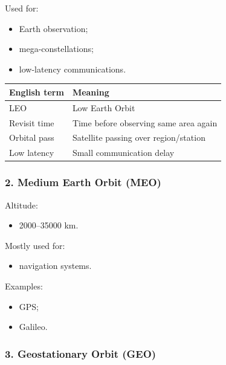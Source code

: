 \documentclass[10pt,a4paper,twocolumn]{article}
\begin{document}
Used for:
\begin{itemize}
    \item Earth observation;
    \item mega-constellations;
    \item low-latency communications.
\end{itemize}

\begin{vocabbox}
    \begin{tabularx}{\columnwidth}{lX}
        \toprule
        English term & Meaning                               \\
        \midrule
        LEO          & Low Earth Orbit                       \\
        Revisit time & Time before observing same area again \\
        Orbital pass & Satellite passing over region/station \\
        Low latency  & Small communication delay             \\
        \bottomrule
    \end{tabularx}
\end{vocabbox}


\subsubsection*{2. Medium Earth Orbit (MEO)}

Altitude:
\begin{itemize}
    \item 2000--35000 km.
\end{itemize}

Mostly used for:
\begin{itemize}
    \item navigation systems.
\end{itemize}

Examples:
\begin{itemize}
    \item GPS;
    \item Galileo.
\end{itemize}


\subsubsection*{3. Geostationary Orbit (GEO)}
\end{document}
